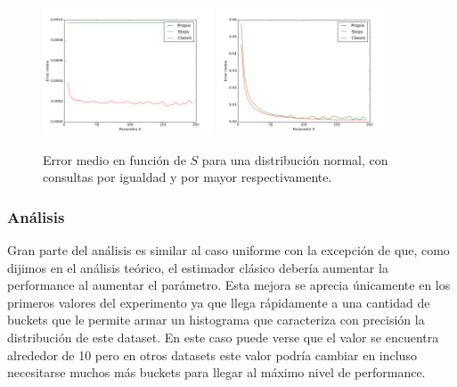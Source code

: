 \begin{figure}[h!]
  \centering
  \includegraphics[width=0.45\textwidth]{../source/datasets/img/normalEqual}
  \includegraphics[width=0.45\textwidth]{../source/datasets/img/normalGreater}
  \caption{Error medio en función de $S$ para una distribución normal, con consultas por igualdad y por mayor respectivamente.}
 \end{figure}

 \subsubsection*{Análisis}
Gran parte del análisis es similar al caso uniforme con la excepción de que, como dijimos en el análisis teórico, el estimador clásico debería aumentar la performance al aumentar el parámetro. Esta mejora se aprecia únicamente en los primeros valores del experimento ya que llega rápidamente a una cantidad de buckets que le permite armar un histograma que caracteriza con precisión la distribución de este dataset. En este caso puede verse que el valor se encuentra alrededor de 10 pero en otros datasets este valor podría cambiar en incluso necesitarse muchos más buckets para llegar al máximo nivel de performance.

